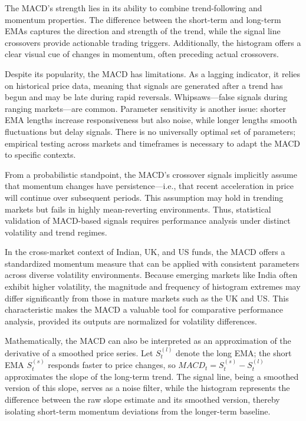 The MACD's strength lies in its ability to combine trend-following and momentum properties. The difference between the short-term and long-term EMAs captures the direction and strength of the trend, while the signal line crossovers provide actionable trading triggers. Additionally, the histogram offers a clear visual cue of changes in momentum, often preceding actual crossovers.

Despite its popularity, the MACD has limitations. As a lagging indicator, it relies on historical price data, meaning that signals are generated after a trend has begun and may be late during rapid reversals. Whipsaws—false signals during ranging markets—are common. Parameter sensitivity is another issue: shorter EMA lengths increase responsiveness but also noise, while longer lengths smooth fluctuations but delay signals. There is no universally optimal set of parameters; empirical testing across markets and timeframes is necessary to adapt the MACD to specific contexts.

From a probabilistic standpoint, the MACD's crossover signals implicitly assume that momentum changes have persistence—i.e., that recent acceleration in price will continue over subsequent periods. This assumption may hold in trending markets but fails in highly mean-reverting environments. Thus, statistical validation of MACD-based signals requires performance analysis under distinct volatility and trend regimes.

In the cross-market context of Indian, UK, and US funds, the MACD offers a standardized momentum measure that can be applied with consistent parameters across diverse volatility environments. Because emerging markets like India often exhibit higher volatility, the magnitude and frequency of histogram extremes may differ significantly from those in mature markets such as the UK and US. This characteristic makes the MACD a valuable tool for comparative performance analysis, provided its outputs are normalized for volatility differences.

Mathematically, the MACD can also be interpreted as an approximation of the derivative of a smoothed price series. Let $S_t^{(l)}$ denote the long EMA; the short EMA $S_t^{(s)}$ responds faster to price changes, so $MACD_t = S_t^{(s)} - S_t^{(l)}$ approximates the slope of the long-term trend. The signal line, being a smoothed version of this slope, serves as a noise filter, while the histogram represents the difference between the raw slope estimate and its smoothed version, thereby isolating short-term momentum deviations from the longer-term baseline.

